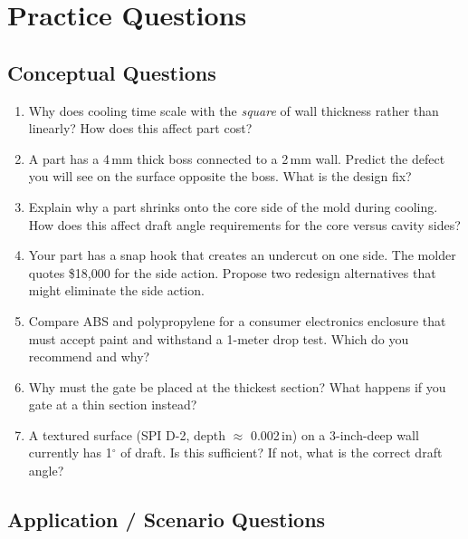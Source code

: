 \documentclass[11pt,letterpaper,twoside,openany]{book}
\providecommand{\ang}[1]{#1\ensuremath{{}^{\circ}}}
\begin{document}
\section{Practice Questions}
\label{sec:practice_b}

\subsection{Conceptual Questions}

\begin{enumerate}[leftmargin=1.5em]
  \item Why does cooling time scale with the \emph{square} of wall thickness rather than linearly? How does this affect part cost?

  \item A part has a 4\,mm thick boss connected to a 2\,mm wall. Predict the defect you will see on the surface opposite the boss. What is the design fix?

  \item Explain why a part shrinks onto the core side of the mold during cooling. How does this affect draft angle requirements for the core versus cavity sides?

  \item Your part has a snap hook that creates an undercut on one side. The molder quotes \$18,000 for the side action. Propose two redesign alternatives that might eliminate the side action.

  \item Compare ABS and polypropylene for a consumer electronics enclosure that must accept paint and withstand a 1-meter drop test. Which do you recommend and why?

  \item Why must the gate be placed at the thickest section? What happens if you gate at a thin section instead?

  \item A textured surface (SPI D-2, depth $\approx$ 0.002\,in) on a 3-inch-deep wall currently has \ang{1} of draft. Is this sufficient? If not, what is the correct draft angle?
\end{enumerate}

\subsection{Application / Scenario Questions}
\end{document}
